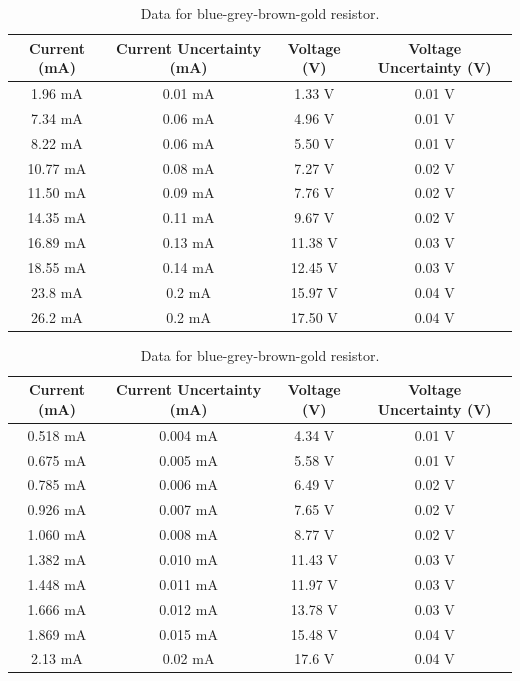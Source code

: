 \documentclass[11pt]{article}
\begin{document}
\begin{table}[!htb]
    \caption{Data for blue-grey-brown-gold resistor.}
    \vspace{1em}\hline\hline\vspace{0.3em}\centering
    \begin{tabular}{cccc}
        Current (mA)&Current Uncertainty (mA)&Voltage (V)&Voltage Uncertainty (V)\\
        \hline

1.96 mA&0.01 mA&1.33 V&0.01 V\\
7.34 mA&0.06 mA&4.96 V&0.01 V\\
8.22 mA&0.06 mA&5.50 V&0.01 V\\
10.77 mA&0.08 mA&7.27 V&0.02 V\\
11.50 mA&0.09 mA&7.76 V&0.02 V\\
14.35 mA&0.11 mA&9.67 V&0.02 V\\
16.89 mA&0.13 mA&11.38 V&0.03 V\\
18.55 mA&0.14 mA&12.45 V&0.03 V\\
23.8 mA&0.2 mA&15.97 V&0.04 V\\
26.2 mA&0.2 mA&17.50 V&0.04 V\\

    \end{tabular}
    \hline\hline
\end{table}


\begin{table}[!htb]
    \caption{Data for blue-grey-brown-gold resistor.}
    \vspace{1em}\hline\hline\vspace{0.3em}\centering
    \begin{tabular}{cccc}
        Current (mA)&Current Uncertainty (mA)&Voltage (V)&Voltage Uncertainty (V)\\
        \hline

0.518 mA&0.004 mA&4.34 V&0.01 V\\
0.675 mA&0.005 mA&5.58 V&0.01 V\\
0.785 mA&0.006 mA&6.49 V&0.02 V\\
0.926 mA&0.007 mA&7.65 V&0.02 V\\
1.060 mA&0.008 mA&8.77 V&0.02 V\\
1.382 mA&0.010 mA&11.43 V&0.03 V\\
1.448 mA&0.011 mA&11.97 V&0.03 V\\
1.666 mA&0.012 mA&13.78 V&0.03 V\\
1.869 mA&0.015 mA&15.48 V&0.04 V\\
2.13 mA&0.02 mA&17.6 V&0.04 V\\

    \end{tabular}
    \hline\hline
\end{table}
\end{document}
